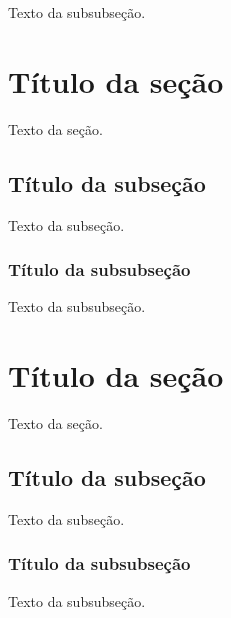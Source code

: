 \documentclass[a4paper,12pt,oneside,onecolumn,final,fleqn]{repUERJ}
\begin{document}
Texto da subsubseção.

\annex %


\section{Título da seção}

Texto da seção.

\subsection{Título da subseção}

Texto da subseção.

\subsubsection{Título da subsubseção}

Texto da subsubseção.


\section{Título da seção}

Texto da seção.

\subsection{Título da subseção}

Texto da subseção.

\subsubsection{Título da subsubseção}

Texto da subsubseção.

\end{document}
